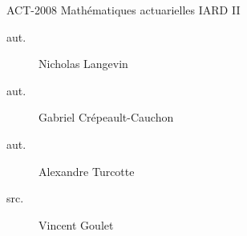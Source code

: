 \begin{contrib}{ACT-2008\: Mathématiques actuarielles IARD II}
\begin{description}
	\item[aut.] Nicholas Langevin
	\item[aut.] Gabriel Crépeault-Cauchon 
	\item[aut.] Alexandre Turcotte 
	\item[src.] Vincent Goulet
\end{description}
\end{contrib}
